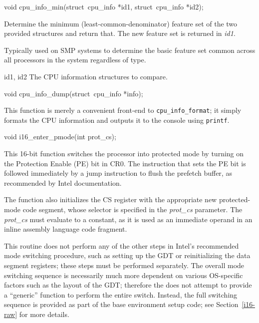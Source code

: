 \begin{apisyn}

	\funcproto void cpu_info_min(struct~cpu_info *id1,
		struct~cpu_info *id2);
\end{apisyn}
\begin{apidesc}
	Determine the minimum (least-common-denominator) feature set of the
	two provided structures and return that.
	The new feature set is returned in \emph{id1}.

	Typically used on SMP systems to determine the basic feature set
	common across all processors in the system regardless of type.
\end{apidesc}
\begin{apiparm}
	\item[id1, id2]
		The CPU information structures to compare.
\end{apiparm}

\begin{apisyn}

	\funcproto void cpu_info_dump(struct~cpu_info *info);
\end{apisyn}
\begin{apidesc}
	This function is merely a convenient front-end to {\tt cpu_info_format};
	it simply formats the CPU information and outputs it to the console
	using {\tt printf}.
\end{apidesc}

\begin{apisyn}

	\funcproto void i16_enter_pmode(int prot_cs);
\end{apisyn}
\begin{apidesc}
	This 16-bit function switches the processor into protected mode
	by turning on the Protection Enable (PE) bit in CR0.
	The instruction that sets the PE bit
	is followed immediately by a jump instruction
	to flush the prefetch buffer,
	as recommended by Intel documentation.

	The function also initializes the CS register
	with the appropriate new protected-mode code segment,
	whose selector is specified in the \emph{prot_cs} parameter.
	The \emph{prot_cs} must evaluate to a constant,
	as it is used as an immediate operand
	in an inline assembly language code fragment.

	This routine does not perform any of the other steps
	in Intel's recommended mode switching procedure,
	such as setting up the GDT
	or reinitializing the data segment registers;
	these steps must be performed separately.
	The overall mode switching sequence
	is necessarily much more dependent on various OS-specific factors
	such as the layout of the GDT;
	therefore the \oskit{} does not attempt
	to provide a ``generic'' function to perform the entire switch.
	Instead, the full switching sequence is provided
	as part of the base environment setup code;
	see Section~\ref{i16-raw} for more details.
\end{apidesc}

